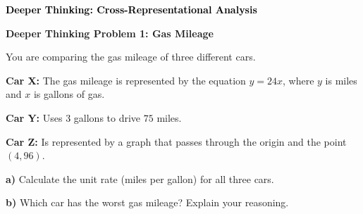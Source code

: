 \documentclass[12pt, letterpaper, fleqn]{article}
\begin{document}
\newpage

\begin{tcolorbox}[colback=customteal!20]
\large\textcolor{black}{\textbf{Deeper Thinking: Cross-Representational Analysis}}
\end{tcolorbox}

\vspace{3mm}

\begin{tcolorbox}[colback=white!15, colframe=black, boxrule=1.5pt, arc=4mm, left=6mm, right=6mm, top=5mm, bottom=5mm]

\textbf{Deeper Thinking Problem 1: Gas Mileage}

\medskip

\noindent
You are comparing the gas mileage of three different cars. 

\vspace{5mm}

\noindent
\textbf{Car X:} The gas mileage is represented by the equation $y = 24x$, where $y$ is miles and $x$ is gallons of gas.

\vspace{5mm}

\noindent
\textbf{Car Y:} Uses $3$ gallons to drive $75$ miles.

\vspace{5mm}

\noindent
\textbf{Car Z:} Is represented by a graph that passes through the origin and the point $(4, 96)$.

\vspace{5mm}

\noindent
\textbf{a)} Calculate the unit rate (miles per gallon) for all three cars.

\vspace{3.5cm}

\noindent
\textbf{b)} Which car has the worst gas mileage? Explain your reasoning.

\vspace{2.5cm}

\end{tcolorbox}
\end{document}
